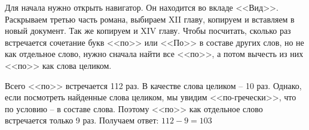 \documentclass[14pt,a4paper]{article}
\begin{document}
Для начала нужно открыть навигатор. Он находится во вкладе <<Вид>>. Раскрываем третью часть романа, выбираем XII главу, копируем и вставляем в новый документ. Так же копируем и XIV главу. Чтобы посчитать, сколько раз встречается сочетание букв <<по>> или <<По>> в составе других слов, но не как отдельное слово, нужно сначала найти все <<по>>, а потом вычесть из них <<по>> как слова целиком.

Всего <<по>> встречается 112 раз. В качестве слова целиком -- 10 раз. Однако, если посмотреть найденные слова целиком, мы увидим <<по-гречески>>, что по условию -- в составе слова. Поэтому <<по>> как отдельное слово встречается только 9 раз. Получаем ответ: $112 - 9 = 103$
\end{document}
